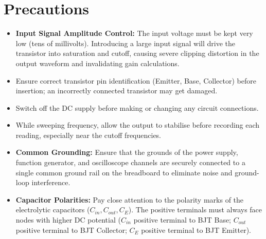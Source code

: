 \section{Precautions}
\begin{itemize}
	\item \textbf{Input Signal Amplitude Control:} The input voltage must be kept very low (tens of millivolts). Introducing a large input signal will drive the transistor into saturation and cutoff, causing severe clipping distortion in the output waveform and invalidating gain calculations.
	\item Ensure correct transistor pin identification (Emitter, Base, Collector) before insertion; an incorrectly connected transistor may get damaged.
	\item Switch off the DC supply before making or changing any circuit connections.
	\item While sweeping frequency, allow the output to stabilise before recording each reading, especially near the cutoff frequencies.
	\item \textbf{Common Grounding:} Ensure that the grounds of the power supply, function generator, and oscilloscope channels are securely connected to a single common ground rail on the breadboard to eliminate noise and ground-loop interference.
	\item \textbf{Capacitor Polarities:} Pay close attention to the polarity marks of the electrolytic capacitors ($C_{in}, C_{out}, C_E$). The positive terminals must always face nodes with higher DC potential ($C_{in}$ positive terminal to BJT Base; $C_{out}$ positive terminal to BJT Collector; $C_E$ positive terminal to BJT Emitter).
\end{itemize}

